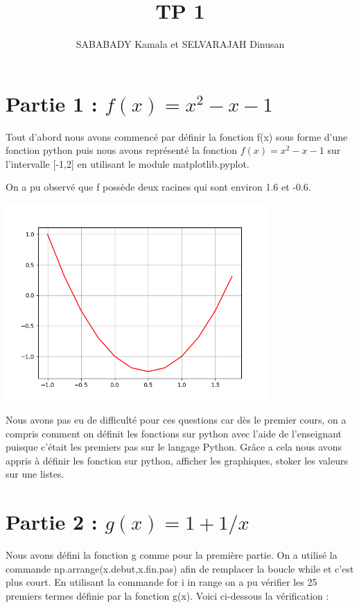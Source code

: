 \documentclass{article}
\title{TP 1}
\author{SABABADY Kamala et SELVARAJAH Dinusan}
\begin{document}
\maketitle

\section{Partie 1 : $ f(x)= x^2-x-1$}

	Tout d'abord nous avons commencé par définir la fonction f(x) sous forme d'une fonction python puis nous avons représenté la fonction
$ f(x)= x^2-x-1$ sur l'intervalle [-1,2] en utilisant le module matplotlib.pyplot.

	On a pu observé que f possède deux racines qui sont environ  1.6 et -0.6. 


    \includegraphics[width=10cm]{figure_1.png}



Nous avons pas eu de difficulté pour ces questions car dès le premier cours, on a compris comment on définit les fonctions sur python avec l'aide de l'enseignant puisque c'était les premiers pas sur le langage Python. Grâce a cela nous avons appris à définir les fonction sur python, afficher les graphiques, stoker les valeurs sur une listes.


\section{Partie 2 : $ g(x) = 1+1/x$ }
	
  Nous avons défini la fonction g comme pour la première partie. On a utilisé la commande np.arrange(x.debut,x.fin.pas) afin de remplacer la boucle while et c'est plus court. En utilisant la commande for i in range on  a pu vérifier les 25 premiers termes définie par la fonction g(x). Voici ci-dessous la vérification :
\end{document}

